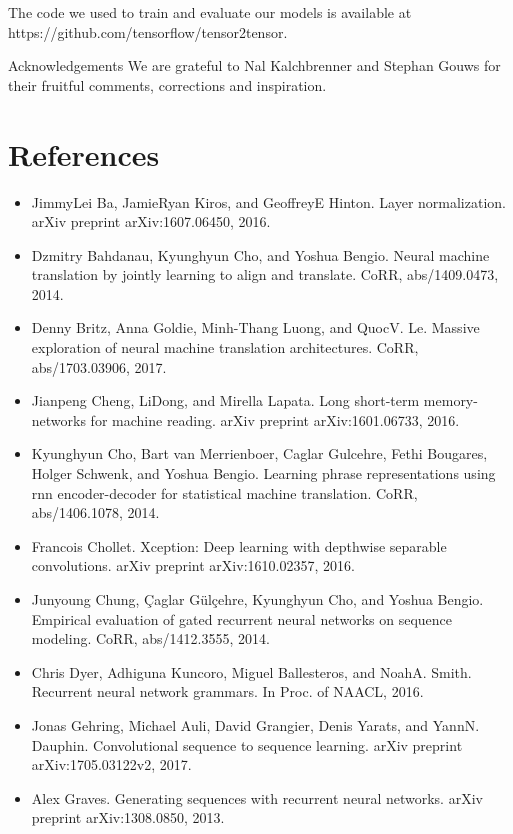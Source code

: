 \documentclass[11pt,a4paper]{article}
\begin{document}
The code we used to train and evaluate our models is available at https://github.com/tensorflow/tensor2tensor.

Acknowledgements We are grateful to Nal Kalchbrenner and Stephan Gouws for their fruitful comments, corrections and inspiration.

\section{References}

\begin{itemize}
\item [layernorm2016] JimmyLei Ba, JamieRyan Kiros, and GeoffreyE Hinton. Layer normalization. arXiv preprint arXiv:1607.06450, 2016.
\item [bahdanau2014neural] Dzmitry Bahdanau, Kyunghyun Cho, and Yoshua Bengio. Neural machine translation by jointly learning to align and translate. CoRR, abs/1409.0473, 2014.
\item [DBLP:journals/corr/BritzGLL17] Denny Britz, Anna Goldie, Minh-Thang Luong, and QuocV. Le. Massive exploration of neural machine translation architectures. CoRR, abs/1703.03906, 2017.
\item [cheng2016long] Jianpeng Cheng, LiDong, and Mirella Lapata. Long short-term memory-networks for machine reading. arXiv preprint arXiv:1601.06733, 2016.
\item [cho2014learning] Kyunghyun Cho, Bart van Merrienboer, Caglar Gulcehre, Fethi Bougares, Holger Schwenk, and Yoshua Bengio. Learning phrase representations using rnn encoder-decoder for statistical machine translation. CoRR, abs/1406.1078, 2014.
\item [xception2016] Francois Chollet. Xception: Deep learning with depthwise separable convolutions. arXiv preprint arXiv:1610.02357, 2016.
\item [gruEval14] Junyoung Chung, Çaglar Gülçehre, Kyunghyun Cho, and Yoshua Bengio. Empirical evaluation of gated recurrent neural networks on sequence modeling. CoRR, abs/1412.3555, 2014.
\item [dyer-rnng:16] Chris Dyer, Adhiguna Kuncoro, Miguel Ballesteros, and NoahA. Smith. Recurrent neural network grammars. In Proc. of NAACL, 2016.
\item [JonasFaceNet2017] Jonas Gehring, Michael Auli, David Grangier, Denis Yarats, and YannN. Dauphin. Convolutional sequence to sequence learning. arXiv preprint arXiv:1705.03122v2, 2017.
\item [graves2013generating] Alex Graves. Generating sequences with recurrent neural networks. arXiv preprint arXiv:1308.0850, 2013.

\end{itemize}
\end{document}
